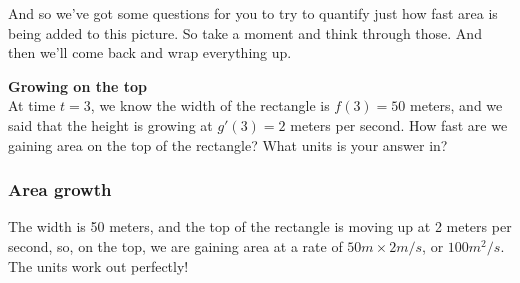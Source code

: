 \documentclass[pdftex, brazil, 12pt, twoside]{article}
\begin{document}
And so we've got some questions for you
to try to quantify just how fast area
is being added to this picture.
So take a moment and think through those.
And then we'll come back and wrap everything up.

\begin{exercise}
  \textbf{Growing on the top}\\%
  At time $t=3$, we know the width of the rectangle is $f(3)=50$ meters, and we said
  that the height is growing at $g'(3) = 2$ meters per second. How fast are we
  gaining area on the top of the rectangle? What units is your answer in?
  \begin{figure}
    \begin{center}
    \end{center}
  \end{figure}
\end{exercise}

\subsubsection{Area growth}
\label{u2-product-rule-area-growth}

The width is 50 meters, and the top of the rectangle is moving up at 2 meters per
second, so, on the top, we are gaining area at a rate of $50m \times 2m/s$, or $100m^2/s$.
The units work out perfectly!
\end{document}

